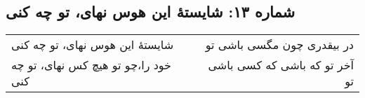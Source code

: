 \begin{center}
\section*{شماره ۱۳: شایستۀ این هوس نهای، تو چه کنی}
\label{sec:013}
\begin{longtable}{l p{0.5cm} r}
شایستهٔ این هوس نهای، تو چه کنی
&&
در بیقدری چون مگسی باشی تو
\\
خود را،‌چو تو هیچ کس نهای، تو چه کنی
&&
آخر تو که باشی که کسی باشی تو
\\
\end{longtable}
\end{center}
